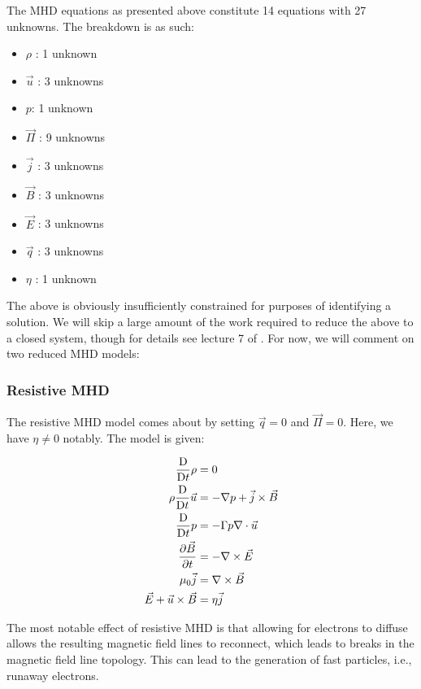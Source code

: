 \begin{remark}
    The MHD equations as presented above constitute 14 equations with 27 unknowns. The breakdown is as such:
    \begin{itemize}
        \item $\rho$ : 1 unknown
        \item $\vec{u}$ : 3 unknowns
        \item $p$: 1 unknown
        \item $\vec{\Pi}$ : 9 unknowns
        \item $\vec{j}$ : 3 unknowns
        \item $\vec{B}$ : 3 unknowns
        \item $\vec{E}$ : 3 unknowns
        \item $\vec{q}$ : 3 unknowns
        \item $\eta$ : 1 unknown
    \end{itemize}
\end{remark}

The above is obviously insufficiently constrained for purposes of identifying a solution. We will skip a large amount 
of the work required to reduce the above to a closed system, though for details see lecture 7 of \cite{mhd-lectures}. 
For now, we will comment on two reduced MHD models:

\subsubsection{Resistive MHD}
The resistive MHD model comes about by setting $\vec{q} = 0$ and $\vec{\Pi} = 0$. Here, we have $\eta \ne 0$ notably. The model 
is given:
\begin{definition}
    \begin{align}
        \frac{\text{D}}{\text{D} t} \rho &= 0 \\
        \rho \frac{\text{D}}{\text{D} t} \vec{u} &= -\nabla p + \vec{j} \times \vec{B}\\
        \frac{\text{D}}{\text{D} t} p  &= -\Gamma p \nabla \cdot \vec{u} \\
        \pdv{\vec{B}}{t} &= -\nabla \times \vec{E} \\
        \mu_0 \vec{j} &= \nabla \times \vec{B} \\
        \vec{E} + \vec{u} \times \vec{B} &= \eta \vec{j}
    \end{align}
\end{definition}

\begin{remark}
    The most notable effect of resistive MHD is that allowing for electrons to diffuse allows the resulting magnetic field lines 
    to reconnect, which leads to breaks in the magnetic field line topology. This can lead to the generation of fast particles, i.e., 
    runaway electrons.
\end{remark}


